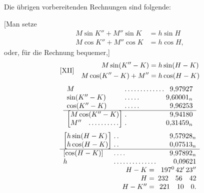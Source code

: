 Die übrigen vorbereitenden Rechnungen sind folgende:

[Man setze
\[
\begin{aligned}
M\sin K''+M''\sin K&=h\sin H\\
M\cos K''+M''\cos K&=h\cos H,
\end{aligned}
\]
oder, für die Rechnung bequemer,]
\[
\begin{array}{l@{\quad}l}
[\mathrm{XII}]&\begin{aligned}
M\sin(K''-K)&=h\sin(H-K)\\
M\cos(K''-K)+M''&=h\cos(H-K)
\end{aligned}
\end{array}
\]
\[
\begin{array}{l@{\;}l@{\;}r}
M&\mathord{.}\,\mathord{.}\,\mathord{.}\,\mathord{.}\,\mathord{.}\,\mathord{.}\,\mathord{.}\,\mathord{.}\,\mathord{.}\,\mathord{.}\,\mathord{.}\,\mathord{.}\,\mathord{.}&9{,}97927\\
\sin(K''-K)&\mathord{.}\,\mathord{.}\,\mathord{.}\,\mathord{.}\,\mathord{.}&9{,}60001_n\\
\cos(K''-K)&\mathord{.}\,\mathord{.}\,\mathord{.}\,\mathord{.}\,\mathord{.}&9{,}96253\\\hline
\left[\begin{array}{@{}l@{}}M\cos(K''-K)\\M''\quad\mathord{.}\,\mathord{.}\,\mathord{.}\,\mathord{.}\,\mathord{.}\,\mathord{.}\,\mathord{.}\,\mathord{.}\,\mathord{.}\,\mathord{.}\end{array}\right]&
\begin{array}{@{}l@{}}\mathord{.}\\\mathord{.}\end{array}&
\begin{array}{@{}r@{}}9{,}94180\\0{,}31459_n\end{array}
\end{array}
\]
\[
\begin{array}{l@{\;}l@{\;}r}
\left[\begin{array}{@{}l@{}}h\sin(H-K)\\h\cos(H-K)\end{array}\right]&
\begin{array}{@{}l@{}}\mathord{.}\,\mathord{.}\\\mathord{.}\,\mathord{.}\end{array}&
\begin{array}{@{}r@{}}9{,}57928_n\\0{,}07513_n\end{array}\\\hline
[\cos(H-K)]&\mathord{.}\,\mathord{.}\,\mathord{.}\,\mathord{.}&9{,}97892_n\\
h&\mathord{.}\,\mathord{.}\,\mathord{.}\,\mathord{.}\,\mathord{.}\,\mathord{.}\,\mathord{.}\,\mathord{.}\,\mathord{.}\,\mathord{.}\,\mathord{.}\,\mathord{.}\,\mathord{.}\,\mathord{.}&0{,}09621\\
\multicolumn{2}{r}{H-K=}&197^{0}\,42'\,23''\\
\multicolumn{2}{r}{H=}&232\quad56\quad42\\
\multicolumn{2}{r}{H-K''=}&221\quad10\quad0.
\end{array}
\]

